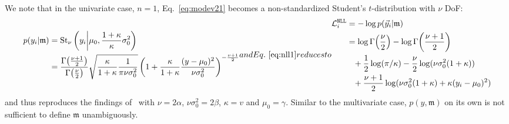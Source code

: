 \documentclass{article}
\begin{document}
We note that in the univariate case, $n=1$, Eq.~\eqref{eq:modev21} becomes a non-standardized Student's $t$-distribution with $\nu$ DoF:
\begin{subequations}
\begin{align}
    p(y_i | \mathfrak{m}) &= \operatorname{St}_\nu \left( y_i \middle| \mu_0, \frac{1 + \kappa}{\kappa} \sigma_0^2 \right) \nonumber \\
    &= \frac{\Gamma\!\left( \frac{\nu + 1}{2} \right)}{\Gamma\!\left( \frac{\nu}{2} \right)} \sqrt{\frac{\kappa}{1 + \kappa} \frac{1}{\pi \nu \sigma_0^2}} \left( 1 + \frac{\kappa}{1 + \kappa} \frac{(y - \mu_0)^2}{\nu \sigma_0^2} \right)^{-\frac{\nu + 1}{2}}
\end{align}
and Eq.~\eqref{eq:nll1} reduces to
\begin{align}
    \mathcal{L}^{\texttt{NLL}}_i &= - \log p(\vec{y}_i | \mathfrak{m}) \nonumber \\
    &= \log \Gamma\!\left( \frac{\nu}{2} \right) - \log \Gamma\!\left( \frac{\nu + 1}{2} \right) \nonumber \\
    &\phantom{=} + \frac{1}{2} \log(\pi  / \kappa) - \frac{\nu}{2} \log(\nu \sigma_0^2 (1 + \kappa)) \nonumber \\
    &\phantom{=} + \frac{\nu + 1}{2} \log( \nu \sigma_0^2 (1 + \kappa) + \kappa (y_i - \mu_0)^2)
\end{align}
\end{subequations}
and thus reproduces the findings of~\cite{amini20} with $\nu = 2\alpha$, $\nu \sigma_0^2 = 2\beta$, $\kappa = v$ and $\mu_0 = \gamma$.
Similar to the multivariate case, $p(y, \mathfrak{m})$ on its own is not sufficient to define $\mathfrak{m}$ unambiguously.
\end{document}
